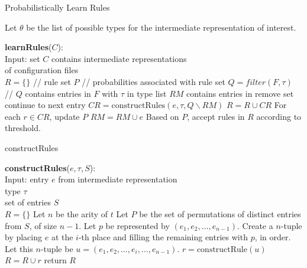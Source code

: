 \begin{algorithm}
\caption{Probabilistically Learn Rules}
  Let $\theta$ be the list of possible types for the intermediate representation of interest.
  \begin{algorithmic}[1]
  \State \textbf{learnRules}($C$):\\

  Input: set $C$ contains intermediate representations\\ 
     \qquad \enspace \enspace of configuration files\\

    \State $R = \{\}$ // rule set
    \State $P$ // probabilities associated with rule set
        \State $Q = filter(F,\tau)$ 
        \State // $Q$ contains entries in $F$ with $\tau$ in type list
        \State $RM$ contains entries in remove set
                        \State continue to next entry
                        \Else \enspace $CR = \textrm{constructRules}(e, \tau, Q \backslash RM)$
                        \State $R = R  \cup CR$
                        \State For each $r \in CR$, update $P$ 
               \EndIf
               \State $RM = RM \cup e$
        \EndFor
     \EndFor
    \EndFor
    \State Based on $P$, accept rules in $R$ according to threshold. 
  \end{algorithmic}
\end{algorithm}


\begin{algorithm}
\caption{constructRules}
  \begin{algorithmic}[1]
  \State \textbf{constructRules}($e, \tau, S$):\\
    Input: entry $e$ from intermediate representation\\ 
     \qquad \enspace \enspace type $\tau$\\
     \qquad \enspace \enspace set of entries $S$\\
     $R = \{\}$
        \State Let $n$ be the arity of $t$
        \State Let $P$ be the set of permutations of distinct entries from $S$, of size $n-1$. 
         \State Let $p$ be represented by $(e_1, e_2, \ldots, e_{n-1})$.
           \State Create a $n$-tuple by placing $e$ at the $i$-th place and filling the remaining entries with $p$, in order. Let this $n$-tuple be $u = (e_1, e_2, \ldots, e_i, \ldots, e_{n-1})$.
           \State $r = \textrm{constructRule}(u)$ 
              $R = R \cup r$
            \EndIf
          \EndFor
        \EndFor
     \EndFor
     \State return $R$
  \end{algorithmic}
\end{algorithm}


